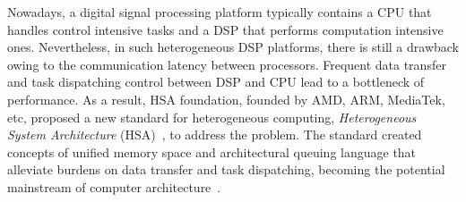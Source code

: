         Nowadays, a digital signal processing platform typically contains a CPU that handles control intensive tasks and a DSP that performs computation intensive ones.
        Nevertheless, in such heterogeneous DSP platforms, there is still a drawback owing to the communication latency between processors. 
        Frequent data transfer and task dispatching control between DSP and CPU lead to a  bottleneck of performance. 
        As a result, HSA foundation, founded by AMD, ARM, MediaTek, etc, proposed a new standard for heterogeneous computing, \textit{Heterogeneous System Architecture} (HSA)~\cite{systemspec}, to address the problem. 
        The standard created concepts of unified memory space and architectural queuing language that alleviate burdens on data transfer and task dispatching, becoming the potential mainstream of computer architecture~\cite{mainstream}.
